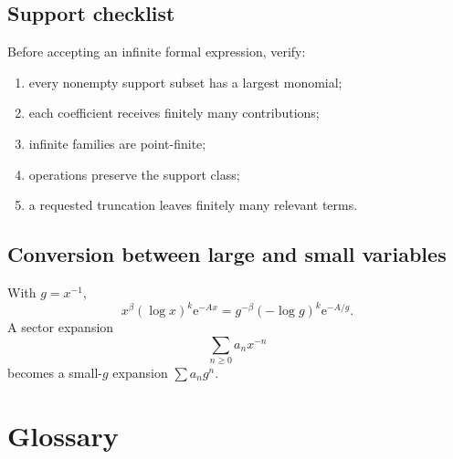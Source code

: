 \documentclass[11pt,oneside,openany]{book}
\newcommand{\e}{\mathrm{e}}
\theoremstyle{plain}
\theoremstyle{definition}
\theoremstyle{remark}
\begin{document}
\section{Support checklist}
Before accepting an infinite formal expression, verify:
\begin{enumerate}
  \item every nonempty support subset has a largest monomial;
  \item each coefficient receives finitely many contributions;
  \item infinite families are point-finite;
  \item operations preserve the support class;
  \item a requested truncation leaves finitely many relevant terms.
\end{enumerate}

\section{Conversion between large and small variables}
With $g=x^{-1}$,
\[
  x^\beta(\log x)^k\e^{-Ax}
  =g^{-\beta}(-\log g)^k\e^{-A/g}.
\]
A sector expansion
\[
  \sum_{n\ge0}a_nx^{-n}
\]
becomes a small-$g$ expansion $\sum a_ng^n$.


\chapter{Glossary}
\label{app:glossary}
\end{document}
